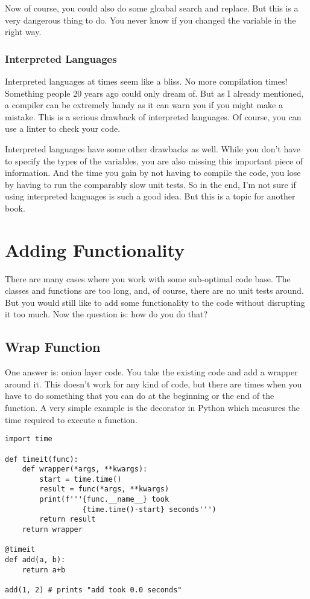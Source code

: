 Now of course, you could also do some gloabal search and replace. But this is a very dangerous thing to do. You never know if you changed the variable in the right way.


\subsection{Interpreted Languages}

Interpreted languages at times seem like a bliss. No more compilation times! Something people 20 years ago could only dream of. But as I already mentioned, a compiler can be extremely handy as it can warn you if you might make a mistake. This is a serious drawback of interpreted languages. Of course, you can use a linter to check your code.

Interpreted languages have some other drawbacks as well. While you don't have to specify the types of the variables, you are also missing this important piece of information. And the time you gain by not having to compile the code, you lose by having to run the comparably slow unit tests. So in the end, I'm not sure if using interpreted languages is such a good idea. But this is a topic for another book.


\chapter{Adding Functionality}

There are many cases where you work with some sub-optimal code base. The classes and functions are too long, and, of course, there are no unit tests around. But you would still like to add some functionality to the code without disrupting it too much. Now the question is: how do you do that?

\section{Wrap Function}

One answer is: onion layer code. You take the existing code and add a wrapper around it. This doesn't work for any kind of code, but there are times when you have to do something that you can do at the beginning or the end of the function. A very simple example is the \code{\@timeit} decorator in Python which measures the time required to execute a function.

\begin{programcode}{}
\begin{verbatim}
import time

def timeit(func):
    def wrapper(*args, **kwargs):
        start = time.time()
        result = func(*args, **kwargs)
        print(f'''{func.__name__} took 
                  {time.time()-start} seconds''')
        return result
    return wrapper
    
@timeit
def add(a, b):
    return a+b

add(1, 2) # prints "add took 0.0 seconds"
\end{verbatim}
\end{programcode}

